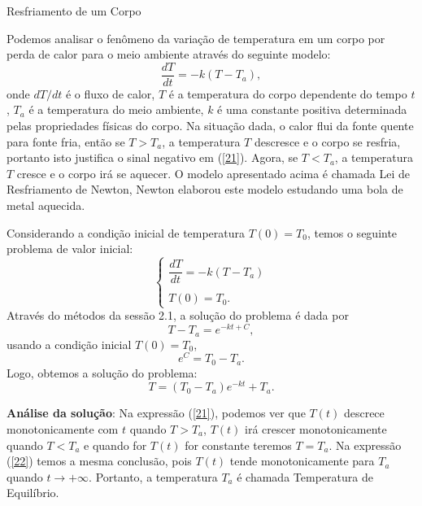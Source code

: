 \documentclass[blue]{beamer}
\numberwithin{equation}{section}
\begin{document}
\begin{frame}{Resfriamento de um Corpo}
	\justifying
	
	\hspace{0.2cm} Podemos analisar o fenômeno da variação de temperatura em um corpo por perda de calor para o meio ambiente através do seguinte modelo:
	\begin{equation} \label{21}
	\dfrac{dT}{dt} = -k(T - T_a),
	\end{equation}
	onde $dT/dt$ é o fluxo de calor, $T$ é a temperatura do corpo dependente do tempo $t$, $T_a$ é a temperatura do meio ambiente, $k$ é uma constante positiva determinada pelas propriedades físicas do corpo. Na situação dada, o calor flui da fonte quente para fonte fria, então se $T > T_a$, a temperatura $T$ descresce e o corpo se resfria, portanto isto justifica o sinal negativo em (\ref{21}). Agora, se $T < T_a$, a temperatura $T$ cresce e o corpo irá se aquecer. O modelo apresentado acima é chamada Lei de Resfriamento de Newton, Newton elaborou este modelo estudando uma bola de metal aquecida.
	
\end{frame}

\begin{frame}
	\justifying
\hspace{0.2cm} Considerando a condição inicial de temperatura $T(0) = T_0$, temos o seguinte problema de valor inicial:
$$\left\lbrace
\begin{array}{lcl} 
\dfrac{dT}{dt} = -k(T - T_a) \\
\\
T(0) = T_0.
\end{array}
\right.$$
Através do métodos da sessão 2.1, a solução do problema é dada por
$$T - T_a = e^{-kt + C},$$
usando a condição inicial $T(0) = T_0$,
$$e^{C} = T_0 - T_a.$$
Logo, obtemos a solução do problema:
\begin{equation} \label{22}
T = (T_0 - T_a)e^{-kt} + T_a.
\end{equation}
	
\end{frame}

\begin{frame}
\begin{flushleft}
	\justifying
	\textbf{Análise da solução}: Na expressão (\ref{21}), podemos ver que $T(t)$ descrece monotonicamente com $t$ quando $T > T_a$, $T(t)$ irá crescer monotonicamente quando $T < T_a$ e quando for $T(t)$ for constante teremos $T = T_a$. Na expressão (\ref{22}) temos a mesma conclusão, pois $T(t)$ tende monotonicamente para $T_a$ quando $t \rightarrow +\infty$. Portanto, a temperatura $T_a$ é chamada Temperatura de Equilíbrio.\end{flushleft}
	
\end{frame}
\end{document}
